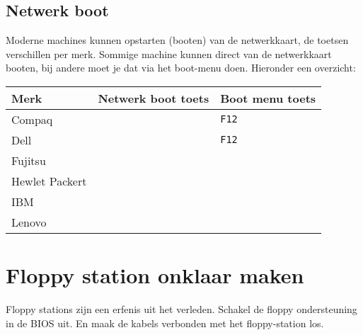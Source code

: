\subsection{Netwerk boot}
Moderne machines kunnen opstarten (booten) van de netwerkkaart, de toetsen verschillen per merk. Sommige machine kunnen direct van de netwerkkaart booten, bij andere moet je dat via het boot-menu doen. Hieronder een overzicht:
\begin{table}[H]
	\begin{tabular}{| l | l |  l |}
	\hline 
	\textbf{Merk} & \textbf{Netwerk boot toets} & \textbf{Boot menu toets}\\
	\hline
	Compaq &  & \texttt{F12}\\
	\hline
	Dell &  & \texttt{F12} \\
	\hline
	Fujitsu &  & \\
	\hline
	Hewlet Packert &   & \\
	\hline
	IBM &   & \\
	\hline
	Lenovo &  &  \\
	\hline
\end{tabular}
\end{table}

\section{Floppy station onklaar maken}
Floppy stations zijn een erfenis uit het verleden. Schakel de floppy ondersteuning in de BIOS uit. En maak de kabels verbonden met het floppy-station los.


